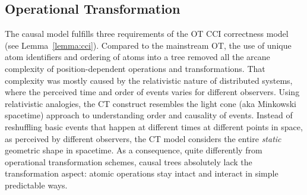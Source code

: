 \documentclass{sig-alternate}
\begin{document}
\subsection{Operational Transformation} \label{sec:ot}

The causal model fulfills three requirements of the OT CCI correctness model (see Lemma~\ref{lemma:cci}).
Compared to the mainstream OT, the use of unique atom identifiers and  ordering of atoms into a tree removed all the arcane complexity of position-dependent operations and transformations.
That complexity was mostly caused by the relativistic nature of distributed systems, where the perceived time and order of events varies for different observers.
Using relativistic analogies, the CT construct resembles the light cone (aka Minkowski spacetime) approach to understanding order and causality of events.
Instead of reshuffling basic events that happen at different times at different points in space, as perceived by different observers, the CT model considers the entire \emph{static} geometric shape in spacetime.
As a consequence, quite differently from operational transformation schemes, causal trees absolutely lack the transformation aspect: atomic operations stay intact and interact in simple predictable ways.
\end{document}
